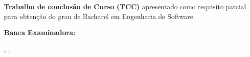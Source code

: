 \begin{titlepage}
	
\begin{center}


{\textbf{\MakeUppercase{\theauthor}} \\ \vspace{1ex}


\vspace{1.8in}

{\Large \textbf{\thetitle} } \\

\vspace{0.8in}
}

\end{center}

\begin{flushright}
\vspace{0.5in}
\parbox{2.75in}
{\textbf{Trabalho de conclusão de Curso (TCC)} apresentado como requisito parcial para obtenção do grau de Bacharel em Engenharia de Software.}
\end{flushright}


\begin{flushright}
\textbf{Banca Examinadora:} \\ \vspace{1ex}
\thequalifiers

\end{flushright}



\vspace{1in}

\begin{center}

\vspace{50pt} {\thelocal, \thedate.}

\end{center}


\end{titlepage}



	
